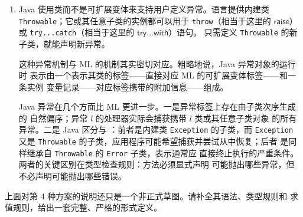 \begin{enumerate}
    ML 抛出异常的语法是 \(\mathsf{raise}\ l(t)\)，其中 \(l\) 是当前作用域
    定义的异常标签。它可以理解为加标签运算符与简单
    \(\mathsf{raise}\) 的组合：
    \[
    \mathsf{raise}\ l(t)
    \quad\triangleq\quad
    \mathsf{raise}\,
      (\langle l=t\rangle\ \mathsf{as}\ T_{\mathit{exn}})
    \]
    类似地，ML 的 try 可以用简单 try 加 case 去糖：
    \[
    \begin{aligned}
    &\mathsf{try}\ t\ \mathsf{with}\ l(x)\Rightarrow h\\
    &\quad\triangleq\quad
    \mathsf{try}\ t\ \mathsf{with}\
    (\lambda e:T_{\mathit{exn}}.\
      \mathsf{case}\ e\ \mathsf{of}\
      \langle l=x\rangle\Rightarrow h
      \mid\ \_\Rightarrow\mathsf{raise}\ e)
    \end{aligned}
    \]
    case 检查抛出的异常是否带标签 \(l\)。若是，就把异常携带的值绑定到
    \(x\)，求值处理器 \(h\)；若不是，就落入通配分支，重新抛出异常。异常
    会继续传播——途中也许被捕获后又抛出——直到到达愿意处理它的处理器，
    或一路到达最外层并终止整个程序。

  \item Java 使用类而不是可扩展变体来支持用户定义异常。语言提供内建类
    \texttt{Throwable}；它或其任意子类的实例都可以用于
    \texttt{throw}（相当于这里的 \(\mathsf{raise}\)）或
    \texttt{try...catch}（相当于这里的 \(\mathsf{try...with}\)）语句。
    只需定义 \texttt{Throwable} 的新子类，就能声明新异常。

    这种异常机制与 ML 的机制其实密切对应。粗略地说，Java 异常对象的运行时
    表示由一个表示其类的标签——直接对应 ML 的可扩展变体标签——和一条实例
    变量记录——对应标签携带的附加信息——组成。

    Java 异常在几个方面比 ML 更进一步。一是异常标签上存在由子类次序生成的
    自然偏序；异常 \(l\) 的处理器实际会捕获携带 \(l\) 类或其任意子类对象
    的所有异常。二是 Java 区分与
    \tapltranslateditalic{错误}：前者是内建类
    \texttt{Exception} 的子类，而 \texttt{Exception} 又是
    \texttt{Throwable} 的子类，应用程序可能希望捕获并尝试从中恢复；后者
    是同样继承自 \texttt{Throwable} 的 \texttt{Error} 子类，表示通常应
    直接终止执行的严重条件。两者的关键区别在类型检查规则：方法必须显式声明
    可能抛出哪些异常，但不必声明可能抛出哪些错误。
\end{enumerate}

\begin{exercise}[\(\star\star\star\)]
\label{ex:14.3.1}
上面对第 4 种方案的说明还只是一个非正式草图。请补全其语法、类型规则和
求值规则，给出一套完整、严格的形式定义。
\end{exercise}

